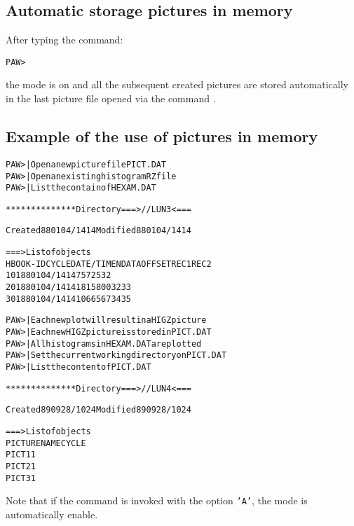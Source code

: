 \subsection{Automatic storage pictures in memory}
After typing the command:
\begin{alltt}
PAW > 
\end{alltt}
the  mode is on and all the subsequent created pictures are stored
automatically in the last picture file opened via the command 
.

\subsection*{Example of the use of pictures in memory}
\begin{alltt}
PAW >     | Open a new picture file PICT.DAT
PAW >        | Open an existing histogram RZ file
PAW >                         | List the contain of HEXAM.DAT
 
 ************** Directory ===> //LUN3 <===
 
                  Created 880104/1414  Modified 880104/1414
 
 ===> List of objects
     HBOOK-ID  CYCLE   DATE/TIME   NDATA   OFFSET    REC1    REC2
         10       1   880104/1414     75     725      32
         20       1   880104/1414   1815     800      32      33
         30       1   880104/1414   1066     567      34      35
 
PAW >        | Each new plot will result in a HIGZ picture
PAW >     | Each new HIGZ picture is stored in PICT.DAT
PAW >    | All histograms in HEXAM.DAT are plotted
PAW >    | Set the current working directory on PICT.DAT
PAW >           | List the content of PICT.DAT
 
 ************** Directory ===> //LUN4 <===
 
                  Created 890928/1024  Modified 890928/1024
 
 ===> List of objects
               PICTURE   NAME                          CYCLE
     PICT1                                                1
     PICT2                                                1
     PICT3                                                1
\end{alltt}

Note that if the command  is invoked with the option
\texttt{'A'}, the  mode is automatically enable.


